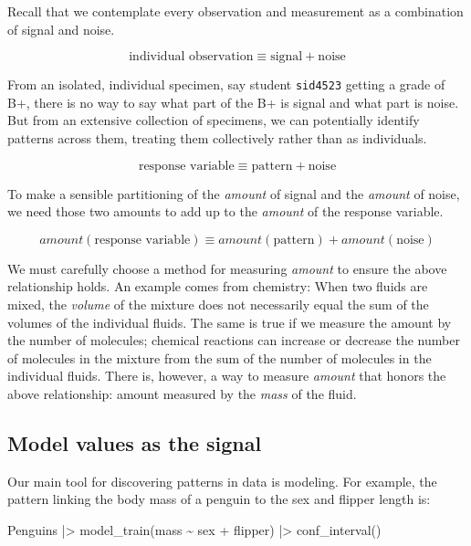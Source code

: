 \documentclass[
  letterpaper,
  DIV=11,
  numbers=noendperiod,
  oneside]{scrartcl}
\newenvironment{Shaded}{\begin{snugshade}}{\end{snugshade}}
\newcommand{\FunctionTok}[1]{\textcolor[rgb]{0.28,0.35,0.67}{#1}}
\newcommand{\NormalTok}[1]{\textcolor[rgb]{0.00,0.23,0.31}{#1}}
\newcommand{\SpecialCharTok}[1]{\textcolor[rgb]{0.37,0.37,0.37}{#1}}
\begin{document}
Recall that we contemplate every observation and measurement as a
combination of signal and noise.

\[ \text{individual observation} \equiv \text{signal} + \text{noise}\]

From an isolated, individual specimen, say student \texttt{sid4523}
getting a grade of B+, there is no way to say what part of the B+ is
signal and what part is noise. But from an extensive collection of
specimens, we can potentially identify patterns across them, treating
them collectively rather than as individuals.

\[ \text{response variable} \equiv \text{pattern} + \text{noise}\]

To make a sensible partitioning of the \emph{amount} of signal and the
\emph{amount} of noise, we need those two amounts to add up to the
\emph{amount} of the response variable.

\[ amount(\text{response variable}) \equiv amount(\text{pattern}) + amount(\text{noise})\]

We must carefully choose a method for measuring \emph{amount} to ensure
the above relationship holds. An example comes from chemistry: When two
fluids are mixed, the \emph{volume} of the mixture does not necessarily
equal the sum of the volumes of the individual fluids. The same is true
if we measure the amount by the number of molecules; chemical reactions
can increase or decrease the number of molecules in the mixture from the
sum of the number of molecules in the individual fluids. There is,
however, a way to measure \emph{amount} that honors the above
relationship: amount measured by the \emph{mass} of the fluid.

\subsection{Model values as the signal}\label{sec-resids-are-noise}

Our main tool for discovering patterns in data is modeling. For example,
the pattern linking the body mass of a penguin to the sex and flipper
length is:

\begin{Shaded}
\begin{Highlighting}[]
\NormalTok{Penguins }\SpecialCharTok{|\textgreater{}} \FunctionTok{model\_train}\NormalTok{(mass }\SpecialCharTok{\textasciitilde{}}\NormalTok{ sex }\SpecialCharTok{+}\NormalTok{ flipper) }\SpecialCharTok{|\textgreater{}} \FunctionTok{conf\_interval}\NormalTok{()}
\end{Highlighting}
\end{Shaded}
\end{document}
